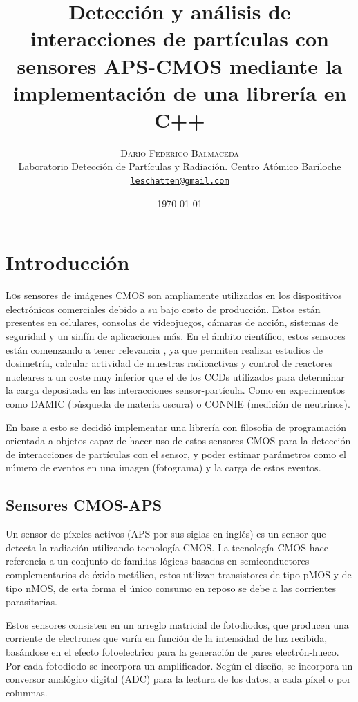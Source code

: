 \documentclass[twoside,twocolumn]{article}
\title{Detección y análisis de interacciones de partículas con sensores APS-CMOS mediante la implementación de una librería en C++}
\author{%
    \textsc{Darío Federico Balmaceda} \\[1ex]     %
    \normalsize Laboratorio Detección de Partículas y Radiación. Centro Atómico Bariloche \\        %
    \normalsize \href{mailto:leschatten@gmail.com}{\texttt{leschatten@gmail.com}}                   %
  }
\date{\today}
\begin{document}
  
  \maketitle              %
  
  \section{Introducción}\label{sec:intro}
    \lettrine[nindent=0em,lines=3]{L}os sensores de imágenes CMOS son ampliamente utilizados en los dispositivos electrónicos comerciales
    debido a su bajo costo de producción. Estos están presentes en celulares, consolas de videojuegos, cámaras de acción,
    sistemas de seguridad y un sinfín de aplicaciones más.
    En el ámbito científico, estos sensores están comenzando a tener relevancia \cite{PerezCMOS},
    ya que permiten realizar estudios de dosimetría, calcular actividad de muestras radioactivas y control de reactores nucleares
    a un coste muy inferior que el de los CCDs utilizados para determinar la carga depositada en las interacciones sensor-partícula.
    Como en experimentos como DAMIC (búsqueda de materia oscura)\cite{DAMIC}
    o CONNIE (medición de neutrinos)\cite{CONNIE}.

    En base a esto se decidió implementar una librería con filosofía de programación orientada a objetos
    capaz de hacer uso de estos sensores CMOS para la detección de interacciones de partículas con el sensor,
    y poder estimar parámetros como el número de eventos en una imagen (fotograma) y la carga de estos eventos.

    \subsection{Sensores CMOS-APS}\label{sec:intro:CMOS_sensor}
      Un sensor de píxeles activos (APS por sus siglas en inglés) es un sensor que detecta la radiación utilizando tecnología CMOS.
      La tecnología CMOS hace referencia a un conjunto de familias lógicas basadas en semiconductores complementarios de óxido metálico,
      estos utilizan transistores de tipo pMOS y de tipo nMOS, de esta forma el único consumo en reposo se debe a las corrientes parasitarias.

      Estos sensores consisten en un arreglo matricial de fotodiodos,
      que producen una corriente de electrones que varía en función de la intensidad de luz recibida,
      basándose en el efecto fotoelectrico para la generación de pares electrón-hueco.
      Por cada fotodiodo se incorpora un amplificador. Según el diseño, se incorpora
      un conversor analógico digital (ADC) para la lectura de los datos, a cada píxel o por columnas.
\end{document}
